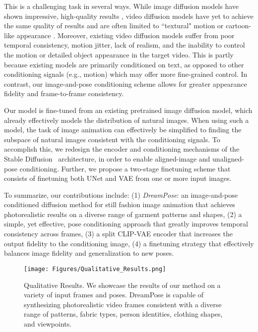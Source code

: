 This is a challenging task in several ways. While image diffusion models have shown impressive, high-quality results \cite{stable_diffusion,dalle2,imagen}, video diffusion models have yet to achieve the same quality of results and are often limited to ``textural" motion or cartoon-like appearance \cite{flexible-diffusion-modeling,imagen_video,video-diffusion-models,make-a-video,ddpm_video}. Moreover, existing video diffusion models suffer from poor temporal consistency, motion jitter, lack of realism, and the inability to control the motion or detailed object appearance in the target video. This is partly because existing models are primarily conditioned on text, as opposed to other conditioning signals (e.g., motion) which may offer more fine-grained control. In contrast, our image-and-pose conditioning scheme allows for greater appearance fidelity and frame-to-frame consistency. 

Our model is fine-tuned from an existing pretrained image diffusion model, which already effectively models the distribution of natural images. When using such a model, the task of image animation can effectively be simplified to 
finding the subspace of natural images consistent with the conditioning signals. To accomplish this, we redesign the encoder and conditioning mechanisms of the Stable Diffusion~\cite{stable_diffusion} architecture, in order to enable aligned-image and unaligned-pose conditioning. Further, we propose a two-stage finetuning scheme that consists of finetuning both UNet and VAE from one or more input images.

To summarize, our contributions include: (1) \emph{DreamPose}: an image-and-pose conditioned diffusion method for still fashion image animation that achieves photorealistic results on a diverse range of garment patterns and shapes, (2) a simple, yet effective, pose conditioning approach that greatly improves temporal consistency across frames, (3) a split CLIP-VAE encoder that increases the output fidelity to the conditioning image, (4)
a finetuning strategy that effectively balances image fidelity and generalization to new poses. %
        

    \begin{figure*}[h!]
      \begin{center}
         \texttt{[image: Figures/Qualitative\_Results.png]}
      \end{center}
       \caption{ Qualitative Results. We showcase the results of our method on a variety of input frames and poses. DreamPose is capable of synthesizing photorealistic video frames consistent with a diverse range of patterns, fabric types, person identities, clothing shapes, and viewpoints. }
    \label{fig:qualitative-results}
    \end{figure*}
    \nopagebreak
    
